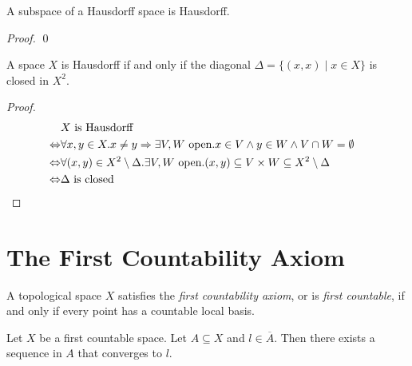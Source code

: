 \begin{theorem}
    A subspace of a Hausdorff space is Hausdorff.
\end{theorem}

\begin{proof}
    \pf
    \qed
\end{proof}

\begin{proposition}
    A space $X$ is Hausdorff if and only if the diagonal $\Delta = \{ (x,x) \mid x \in X \}$ is closed in $X^2$.
\end{proposition}

\begin{proof}
    \pf
    \begin{align*}
        & X \text{ is Hausdorff} \\
        \Leftrightarrow & \forall x,y \in X. x \neq y \Rightarrow \exists V, W \text{ open}. x \in V \wedge y \in W \wedge V \cap W = \emptyset \\
        \Leftrightarrow & \forall (x,y) \in X^2 \setminus \Delta. \exists V,W \text{ open}. (x,y) \subseteq V \times W \subseteq X^2 \setminus \Delta \\
        \Leftrightarrow & \Delta \text{ is closed} & \qed
    \end{align*}
\end{proof}

\section{The First Countability Axiom}

\begin{definition}
    A topological space $X$ satisfies the \emph{first countability axiom}, or is \emph{first countable}, if and only if every point has a countable local basis.
\end{definition}

\begin{lemma}
    Let $X$ be a first countable space. Let $A \subseteq X$ and $l \in \overline{A}$.
    Then there exists a sequence in $A$ that converges to $l$.
\end{lemma}

